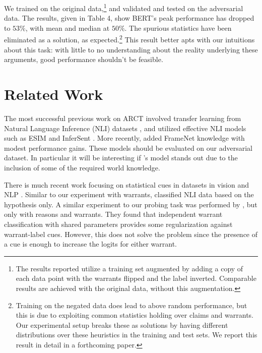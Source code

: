 \documentclass[11pt,a4paper]{article}
\begin{document}
We trained on the original data,\footnote{The results reported utilize a training set augmented by adding a copy of each data point with the warrants flipped and the label inverted. Comparable results are achieved with the original data, without this augmentation.} and validated and tested on the adversarial data. The results, given in Table 4, show BERT's peak performance has dropped to $53\%$, with mean and median at $50\%$. The spurious statistics have been eliminated as a solution, as expected.\footnote{Training on the negated data does lead to above random performance, but this is due to exploiting common statistics holding over claims and warrants. Our experimental setup breaks these as solutions by having different distributions over these heuristics in the training and test sets. We report this result in detail in a forthcoming paper.} This result better apts with our intuitions about this task: with little to no understanding about the reality underlying these arguments, good performance shouldn't be feasible.

\section{Related Work}

The most successful previous work on ARCT \cite{ChoiL18, ZhaoLLZY18, NivenK18} involved transfer learning from Natural Language Inference (NLI) datasets \cite{BowmanAPM15, WilliamsNB17}, and utilized effective NLI models such as ESIM \cite{ChenZLWJ16} and InferSent \cite{ConneauKSBB17}. More recently, \citeauthor{BotschenSG18}  added FrameNet knowledge with modest performance gains. These models should be evaluated on our adversarial dataset. In particular it will be interesting if \citeauthor{BotschenSG18}'s model stands out due to the inclusion of some of the required world knowledge.

There is much recent work focusing on statistical cues in datasets in vision \cite{JoB17} and NLP \cite{SanchezMR18, McCoyPL19, GururanganSLSBS18, GlocknerSG18, PoliakNHRD18, RajpurkarJL18, JiaL17}. Similar to our experiment with warrants, \citeauthor{PoliakNHRD18}  classified NLI data based on the hypothesis only. A similar experiment to our probing task was performed by \citeauthor{NivenK18} , but only with reasons and warrants. They found that independent warrant classification with shared parameters provides some regularization against warrant-label cues. However, this does not solve the problem since the presence of a cue is enough to increase the logits for either warrant.
\end{document}
